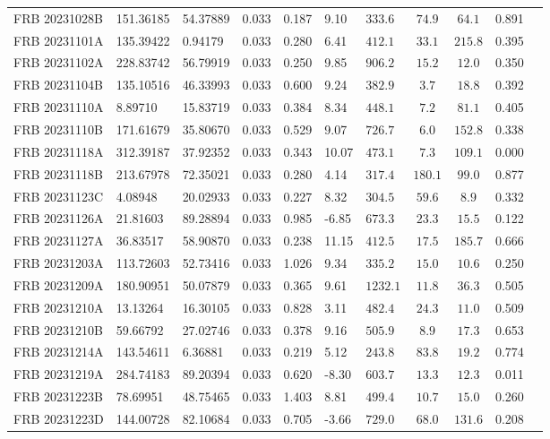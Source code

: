 \begin{longtable}{lllllllccll}
FRB 20231028B & 151.36185 & 54.37889 & 0.033 & 0.187 & 9.10 & $333.6$ & $74.9$ & $64.1$ & 0.891 \\
FRB 20231101A & 135.39422 & 0.94179 & 0.033 & 0.280 & 6.41 & $412.1$ & $33.1$ & $215.8$ & 0.395 \\
FRB 20231102A & 228.83742 & 56.79919 & 0.033 & 0.250 & 9.85 & $906.2$ & $15.2$ & $12.0$ & 0.350 \\
FRB 20231104B & 135.10516 & 46.33993 & 0.033 & 0.600 & 9.24 & $382.9$ & $3.7$ & $18.8$ & 0.392 \\
FRB 20231110A & 8.89710 & 15.83719 & 0.033 & 0.384 & 8.34 & $448.1$ & $7.2$ & $81.1$ & 0.405 \\
FRB 20231110B & 171.61679 & 35.80670 & 0.033 & 0.529 & 9.07 & $726.7$ & $6.0$ & $152.8$ & 0.338 \\
FRB 20231118A & 312.39187 & 37.92352 & 0.033 & 0.343 & 10.07 & $473.1$ & $7.3$ & $109.1$ & 0.000 \\
FRB 20231118B & 213.67978 & 72.35021 & 0.033 & 0.280 & 4.14 & $317.4$ & $180.1$ & $99.0$ & 0.877 \\
FRB 20231123C & 4.08948 & 20.02933 & 0.033 & 0.227 & 8.32 & $304.5$ & $59.6$ & $8.9$ & 0.332 \\
FRB 20231126A & 21.81603 & 89.28894 & 0.033 & 0.985 & -6.85 & $673.3$ & $23.3$ & $15.5$ & 0.122 \\
FRB 20231127A & 36.83517 & 58.90870 & 0.033 & 0.238 & 11.15 & $412.5$ & $17.5$ & $185.7$ & 0.666 \\
FRB 20231203A & 113.72603 & 52.73416 & 0.033 & 1.026 & 9.34 & $335.2$ & $15.0$ & $10.6$ & 0.250 \\
FRB 20231209A & 180.90951 & 50.07879 & 0.033 & 0.365 & 9.61 & $1232.1$ & $11.8$ & $36.3$ & 0.505 \\
FRB 20231210A & 13.13264 & 16.30105 & 0.033 & 0.828 & 3.11 & $482.4$ & $24.3$ & $11.0$ & 0.509 \\
FRB 20231210B & 59.66792 & 27.02746 & 0.033 & 0.378 & 9.16 & $505.9$ & $8.9$ & $17.3$ & 0.653 \\
FRB 20231214A & 143.54611 & 6.36881 & 0.033 & 0.219 & 5.12 & $243.8$ & $83.8$ & $19.2$ & 0.774 \\
FRB 20231219A & 284.74183 & 89.20394 & 0.033 & 0.620 & -8.30 & $603.7$ & $13.3$ & $12.3$ & 0.011 \\
FRB 20231223B & 78.69951 & 48.75465 & 0.033 & 1.403 & 8.81 & $499.4$ & $10.7$ & $15.0$ & 0.260 \\
FRB 20231223D & 144.00728 & 82.10684 & 0.033 & 0.705 & -3.66 & $729.0$ & $68.0$ & $131.6$ & 0.208 \\

\end{longtable}
